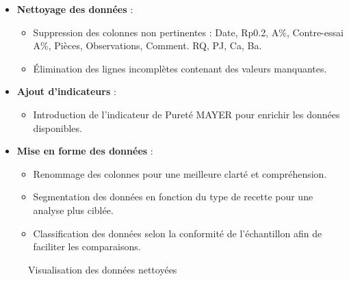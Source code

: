 \documentclass[12pt]{article}
\begin{document}
\begin{itemize}
    \item \textbf{Nettoyage des données} :
    \begin{itemize}
        \item Suppression des colonnes non pertinentes : Date, Rp0.2, A\%, Contre-essai A\%, Pièces, Observations, Comment. RQ, PJ, Ca, Ba.
        \item Élimination des lignes incomplètes contenant des valeurs manquantes.
    \end{itemize}

    \vspace{0.5cm}

    
    \item \textbf{Ajout d'indicateurs} :
    \begin{itemize}
        \item Introduction de l'indicateur de Pureté MAYER pour enrichir les données disponibles.
    \end{itemize}

    
    \vspace{0.5cm}
    
    \item \textbf{Mise en forme des données} :
    \begin{itemize}
        \item Renommage des colonnes pour une meilleure clarté et compréhension.
        \item Segmentation des données en fonction du type de recette pour une analyse plus ciblée.
        \item Classification des données selon la conformité de l'échantillon afin de faciliter les comparaisons.
    \end{itemize}
\end{itemize}

    


\begin{figure}[H]
    \centering
    \caption{Visualisation des données nettoyées}
    \label{fig:donnees_nettoyees}
\end{figure}
\end{document}
